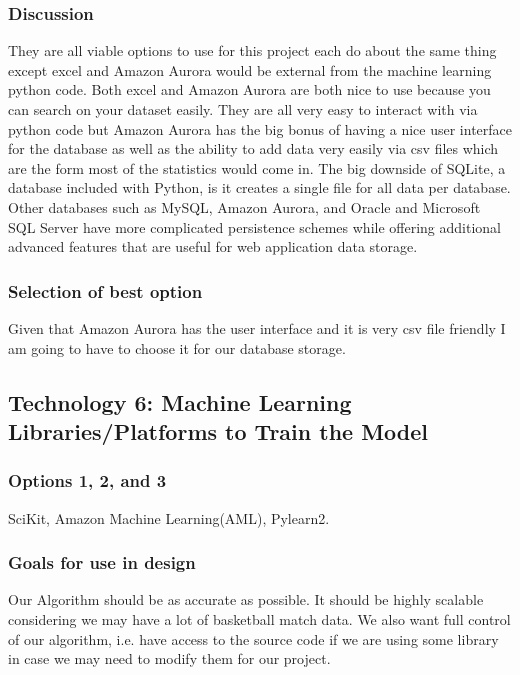 \documentclass[journal,onecolumn]{IEEEtran}
\begin{document}
\subsubsection{Discussion}
They are all viable options to use for this project each do about the same thing except excel and Amazon Aurora would be external from the machine learning python code. Both excel and Amazon Aurora are both nice to use because you can search on your dataset easily. They are all very easy to interact with via python code but Amazon Aurora has the big bonus of having a nice user interface for the database as well as the ability to add data very easily via csv files which are the form most of the statistics would come in. The big downside of SQLite, a database included with Python, is it creates a single file for all data per database. Other databases such as MySQL, Amazon Aurora, and Oracle and Microsoft SQL Server have more complicated persistence schemes while offering additional advanced features that are useful for web application data storage.  
\subsubsection{Selection of best option}
Given that Amazon Aurora has the user interface and it is very csv file friendly I am going to have to choose it for our database storage.


\subsection{Technology 6: Machine Learning Libraries/Platforms to Train the Model}

\subsubsection{Options 1, 2, and 3}
SciKit, Amazon Machine Learning(AML), Pylearn2. 
\subsubsection{Goals for use in design}
Our Algorithm should be as accurate as possible. It should be highly scalable considering we may have a lot of basketball match data. We also want full control of our algorithm, i.e. have access to the source code if we are using some library in case we may need to modify them for our project.
\end{document}
